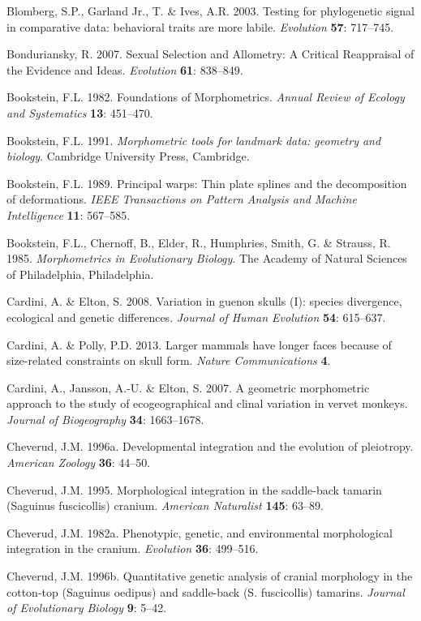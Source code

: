 \documentclass[12pt,twoside]{report}
\begin{document}
Blomberg, S.P., Garland Jr., T. \& Ives, A.R. 2003. Testing for
phylogenetic signal in comparative data: behavioral traits are more
labile. \emph{Evolution} \textbf{57}: 717--745.

Bonduriansky, R. 2007. Sexual Selection and Allometry: A Critical
Reappraisal of the Evidence and Ideas. \emph{Evolution} \textbf{61}:
838--849.

Bookstein, F.L. 1982. Foundations of Morphometrics. \emph{Annual Review
of Ecology and Systematics} \textbf{13}: 451--470.

Bookstein, F.L. 1991. \emph{Morphometric tools for landmark data:
geometry and biology}. Cambridge University Press, Cambridge.

Bookstein, F.L. 1989. Principal warps: Thin plate splines and the
decomposition of deformations. \emph{IEEE Transactions on Pattern
Analysis and Machine Intelligence} \textbf{11}: 567--585.

Bookstein, F.L., Chernoff, B., Elder, R., Humphries, Smith, G. \&
Strauss, R. 1985. \emph{Morphometrics in Evolutionary Biology}. The
Academy of Natural Sciences of Philadelphia, Philadelphia.

Cardini, A. \& Elton, S. 2008. Variation in guenon skulls (I): species
divergence, ecological and genetic differences. \emph{Journal of Human
Evolution} \textbf{54}: 615--637.

Cardini, A. \& Polly, P.D. 2013. Larger mammals have longer faces
because of size-related constraints on skull form. \emph{Nature
Communications} \textbf{4}.

Cardini, A., Jansson, A.-U. \& Elton, S. 2007. A geometric morphometric
approach to the study of ecogeographical and clinal variation in vervet
monkeys. \emph{Journal of Biogeography} \textbf{34}: 1663--1678.

Cheverud, J.M. 1996a. Developmental integration and the evolution of
pleiotropy. \emph{American Zoology} \textbf{36}: 44--50.

Cheverud, J.M. 1995. Morphological integration in the saddle-back
tamarin (Saguinus fuscicollis) cranium. \emph{American Naturalist}
\textbf{145}: 63--89.

Cheverud, J.M. 1982a. Phenotypic, genetic, and environmental
morphological integration in the cranium. \emph{Evolution} \textbf{36}:
499--516.

Cheverud, J.M. 1996b. Quantitative genetic analysis of cranial
morphology in the cotton-top (Saguinus oedipus) and saddle-back (S.
fuscicollis) tamarins. \emph{Journal of Evolutionary Biology}
\textbf{9}: 5--42.
\end{document}
